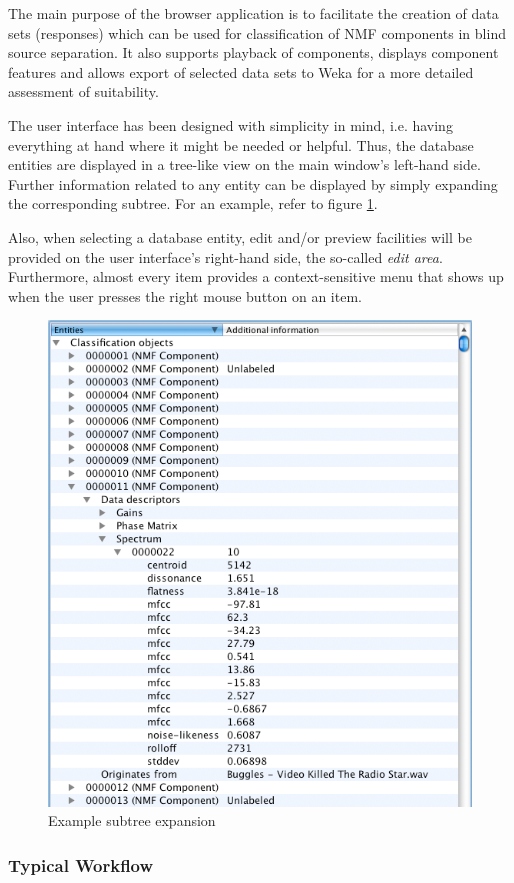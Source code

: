 The main purpose of the browser application is to facilitate the creation
of data sets (responses) which can be used for classification of NMF components
in blind source separation. It also supports playback of components,
displays component features and allows export of selected
data sets to Weka \cite{Weka} for a more detailed assessment of suitability.

The user interface has been designed with simplicity in mind, i.e. having
everything at hand where it might be needed or helpful. Thus, the database
entities are displayed in a tree-like view on the main window's left-hand side.
Further information related to any entity can be displayed by simply expanding
the corresponding subtree. For an example, refer to figure
\ref{figure:ExpandedSubtree}.

Also, when selecting a database entity, edit and/or preview facilities will be
provided on the user interface's right-hand side, the so-called \emph{edit
  area}. Furthermore, almost every item provides a context-sensitive menu that
shows up when the user presses the right mouse button on an item.

\begin{figure}
    \centering
    \includegraphics[width=.5\textwidth]{images/ExpandedSubtree.png}
    \caption{%
        \label{figure:ExpandedSubtree}%
        Example subtree expansion
    }
\end{figure}


\subsubsection{Typical Workflow}

